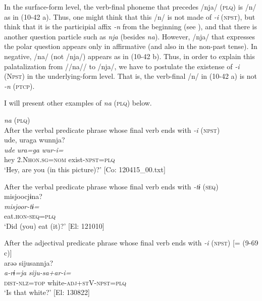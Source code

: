 In the surface-form level, the verb-final phoneme that precedes /nja/ (\textsc{plq}) is /n/ as in (10-42 a). Thus, one might think that this /n/ is not made of \textit{{}-i} (\textsc{npst}), but think that it is the participial affix \textit{{}-n} from the beginning (see ), and that there is another question particle such as \textit{nja} (besides \textit{na}). However, /nja/ that expresses the polar question appears only in affirmative (and also in the non-past tense). In negative, /na/ (not /nja/) appears as in (10-42 b). Thus, in order to explain this palatalization from //na// to /nja/, we have to postulate the existense of \textit{-i} (N\textsc{pst}) in the underlying-form level. That is, the verb-final /n/ in (10-42 a) is not \textit{{}-n} (\textsc{ptcp}).

  I will present other examples of \textit{na} (\textsc{plq}) below.

\ea\label{ex:10.43}   \textit{na} (\textsc{plq})\\
  \ea After the verbal predicate phrase whose final verb ends with \textit{{}-i} (\textsc{npst})\\
      \glll    ude,  uraga  wunnja?\\
    \textit{ude}  \textit{ura=ga}  \textit{wur-i=}\\
    hey  2.N\textsc{hon}.\textsc{sg}=\textsc{nom}  exist-\textsc{npst}=\textsc{plq}\\
\glt     ‘Hey, are you (in this picture)?’  [Co: 120415\_00.txt]

  \ex After the verbal predicate phrase whose final verb ends with \textit{{}-tɨ} (\textsc{seq})\\
      \glll    misjoocjɨna?\\
    \textit{misjoor-tɨ=}\\
    eat.\textsc{hon}-\textsc{seq}=\textsc{plq}\\
    \glt     ‘Did (you) eat (it)?’ [El: 121010]

  \ex After the adjectival predicate phrase whose final verb ends with \textit{{}-i} (\textsc{npst}) [= (9-69 c)]\\
      \glll    arəə  sijusannja?\\
    \textit{a-rɨ=ja}  \textit{siju-sa+ar-i=}\\
    \textsc{dist}-\textsc{nlz}=\textsc{top}  white-\textsc{adj}+\textsc{st}V-\textsc{npst}=\textsc{plq}\\
    \glt     ‘Is that white?’ [El: 130822]

